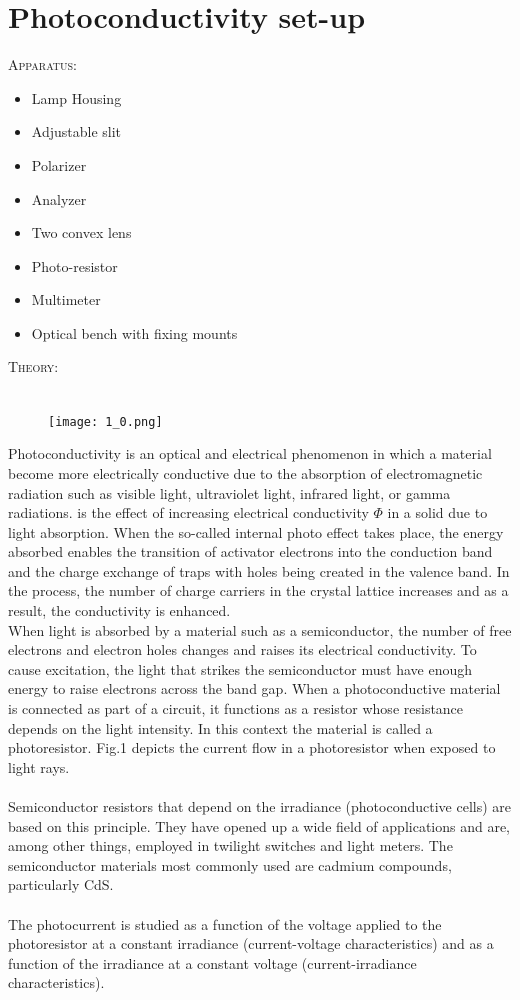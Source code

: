\documentclass[12pt]{report}
\begin{document}
\section{Photoconductivity set-up}
\textsc{\large{Apparatus: }}
\begin{itemize}
	\item Lamp Housing
	\item Adjustable slit
	\item Polarizer
	\item Analyzer
	\item Two convex lens
	\item Photo-resistor
	\item Multimeter
	\item Optical bench with fixing mounts
\end{itemize}
\textsc{\large{Theory:}}
\\
\\
\begin{figure}
	\begin{center}
		\texttt{[image: 1\_0.png]}
	\end{center}
\end{figure}
Photoconductivity is an optical and electrical phenomenon in which a material become more electrically conductive due to the absorption of electromagnetic radiation such as visible light, ultraviolet light, infrared light, or gamma radiations. is the effect of increasing electrical conductivity $\Phi$ in a solid due to light absorption. When the so-called internal photo effect takes place, the energy absorbed enables the transition of activator electrons into the conduction band and the charge exchange of traps with holes being created in the valence band. In the process, the number of charge carriers in the crystal lattice increases and as a result, the conductivity is enhanced.\\
\newpage
When light is absorbed by a material such as a semiconductor, the number of free electrons and electron holes changes and raises its electrical conductivity. To cause excitation, the light that strikes the semiconductor must have enough energy to raise electrons across the band gap. When a photoconductive material is connected as part of a circuit, it functions as a resistor whose resistance depends on the light intensity. In this context the material is called a photoresistor. Fig.1 depicts the current flow in a photoresistor when exposed to light rays.\\ \\Semiconductor resistors that depend on the irradiance (photoconductive cells) are based on this principle. They have opened up a wide field of applications and are, among other things, employed in twilight switches and light meters. The semiconductor materials most commonly used are cadmium compounds, particularly CdS. \\ \\The photocurrent is studied as a function of the voltage applied to the photoresistor at a constant irradiance (current-voltage characteristics) and as a function of the irradiance at a constant voltage (current-irradiance characteristics). 
\end{document}
